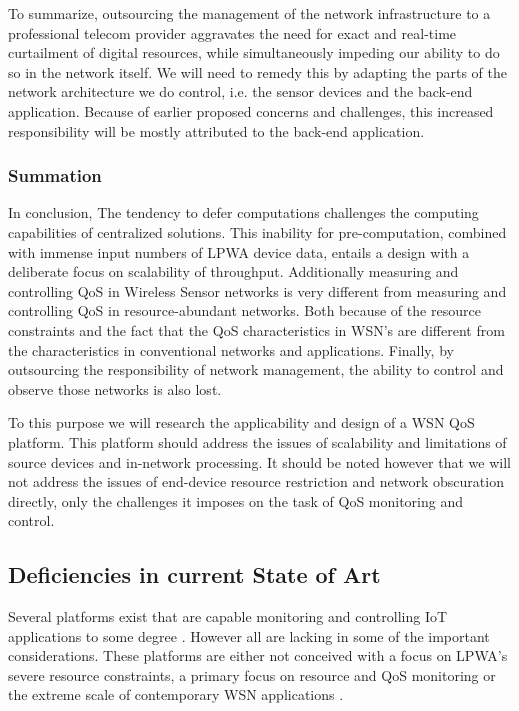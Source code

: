 To summarize, outsourcing the management of the network infrastructure to a professional telecom provider aggravates the need for exact and real-time curtailment of digital resources, while simultaneously impeding our ability to do so in the network itself. We will need to remedy this by adapting the parts of the network architecture we do control, i.e. the sensor devices and the back-end application. Because of earlier proposed concerns and challenges, this increased responsibility will be mostly attributed to the back-end application.

\subsubsection{Summation}
In conclusion, The tendency to defer computations challenges the computing capabilities of centralized solutions. This inability for pre-computation, combined with immense input numbers of LPWA device data, entails a design with a deliberate focus on scalability of throughput. Additionally measuring and controlling QoS in Wireless Sensor networks is very different from measuring and controlling QoS in resource-abundant networks. Both because of the resource constraints and the fact that the QoS characteristics in WSN's are different from the characteristics in conventional networks and applications. Finally, by outsourcing the responsibility of network management, the ability to control and observe those networks is also lost.

To this purpose we will research the applicability and design of a WSN QoS platform. This platform should address the issues of scalability and limitations of source devices and in-network processing. It should be noted however that we will not address the issues of end-device resource restriction and network obscuration directly, only the challenges it imposes on the task of QoS monitoring and control.

\subsection{Deficiencies in current State of Art}
Several platforms exist that are capable monitoring and controlling IoT applications to some degree \cite{refs_to_platoforms}. However all are lacking in some of the important considerations. These platforms are either not conceived with a focus on LPWA's severe resource constraints, a primary focus on resource and QoS monitoring or the extreme scale of contemporary WSN applications \cite{platform surveys}.

